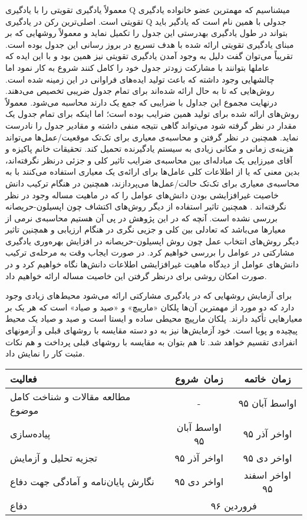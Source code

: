 \documentclass[12pt,a4paper]{article}
\newcommand{\renderref}[1] { \begingroup \let\clearpage\relax  \endgroup }
\begin{document}
معمولاً یادگیری تقویتی را با یادگیری Q میشناسیم که مهمترین عضو خانواده یادگیری تقویتی است. اصلی‌ترین رکن در
یادگیری Q جدولی با همین نام است که یادگیر باید بتواند در طول یادگیری بهدرستی این جدول را تکمیل نماید و معمولاً روشهایی
که بر مبنای یادگیری تقویتی ارائه شده با هدف تسریع در بروز رسانی این جدول بوده است. تقریباً می‌توان گفت دلیل به وجود
آمدن یادگیری تقویتی نیز همین بود و با این ایده که عاملها بتوانند با مشارکت زودتر جدول خود را کامل کنند شروع به کار نمود
اما چالشهایی وجود داشته که باعث تولید ایده‌های فراوانی در این زمینه شده است.
روش‌هایی که تا به حال ارائه‌ شده‌اند برای تمام جدول ضریبی تخصیص می‌دهند. درنهایت مجموع این جداول با ضرایبی که
جمع یک دارند محاسبه می‌شود. معمولاً روش‌های ارائه‌ شده برای تولید همین ضرایب بوده است؛ اما اینکه برای تمام جدول یک
مقدار در نظر گرفته شود می‌تواند گاهی نتیجه منفی داشته و مقادیر جدول را نادرست نماید. همچنین در نظر گرفتن و محاسبه‌ی معیاری برای تک‌تک موقعیت/عمل‌ها می‌تواند هزینه‌ی زمانی و مکانی زیادی به سیستم یادگیرنده تحمیل کند.
تحقیقات خانم پاکیزه و آقای میرزایی  یک مبادله‌ای بین محاسبه‌ی ضرایب تاثیر کلی و جزئی درنظر نگرفته‌اند، بدین معنی که یا از اطلاعات کلی عامل‌ها برای ارائه‌ی یک معیاری استفاده می‌کنند با به محاسبه‌ی معیاری برای تک‌تک حالت/عمل‌ها می‌پردازند، همچنین در هنگام ترکیب دانش خاصیت غیرافزایشی بودن دانش‌های عوامل را که در ماهیت مساله وجود در نظر نگرفته‌اند . همچنین تاثیر استفاده از دیگر روش‌های اکتشاف چون اپسیلون-حریصانه بررسی نشده است.
آنچه که در این پژوهش در پی آن هستیم محاسبه‌ی نرمی از معیار‌ها می‌باشد که تعادلی بین کلی و جزیی نگری در هنگام ارزیابی و همچنین تاثیر دیگر روش‌های انتخاب عمل چون روش اپسیلون-حریصانه در افزایش بهره‌وری یادگیری مشارکتی در عوامل را بررسی خواهیم کرد. در صورت ایجاب وقت به مرحله‌ی ترکیب دانش‌های عوامل از دیدگاه ماهیت غیرافزایشی اطلاعات دانش‌ها نگاه خواهیم کرد و در صورت امکان روشی برای درنظر گرفتن این خاصیت مساله ارائه خواهیم داد.

برای آزمایش روشهایی که در یادگیری مشارکتی ارائه می‌شود محیط‌های زیادی وجود دارد که دو مورد از مهمترین آن‌ها
پلکان «مارپیچ» و «صید و صیاد» است که هر یک بر معیارهایی تأکید دارند. پلکان مارپیچ محیطی ساده و ایستا است و صید و صیاد یک
محیط پیچیده و پویا است. خود آزمایش‌ها نیز به دو دسته مقایسه با روشهای قبلی و آزمونهای انفرادی تقسیم خواهد شد. تا هم
بتوان به مقایسه با روشهای قبلی پرداخت و هم نکات مثبت کار را نمایش داد.
\begin{table}[h!]
\centering
\begin{tabular}{p{8cm}|c|c}
فعالیت & زمان\ شروع & زمان\ خاتمه
\\\hline
 مطالعه مقالات و شناخت کامل موضوع & - & اواسط آبان ۹۵
\\\hline
پیاده‌سازی & اواسط آبان ۹۵ & اواخر آذر ۹۵
\\\hline
تجزیه تحلیل و آزمایش & اواخر آذر ۹۵ & اواخر دی ۹۵
\\\hline
نگارش پایان‌نامه و آمادگی جهت دفاع & اواخر دی ۹۵ & اواخر اسفند ۹۵
\\\hline
دفاع & \multicolumn{2}{c}{فروردین ۹۶}
\end{tabular}
\end{table}

\renderref{reference}
\end{document}
